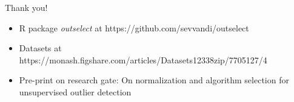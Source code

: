 \documentclass{beamer}
\begin{document}
\begin{darkframes}
 	\begin{frame}{Thank you!}
 	\centering
 	\begin{itemize}
 		\item R package \textit{outselect} at https://github.com/sevvandi/outselect
 		\item Datasets at https://monash.figshare.com/articles/Datasets12338zip/7705127/4
 		\item  Pre-print on research gate: On normalization and algorithm selection for unsupervised outlier detection 
 	\end{itemize}
 
 		
 	\end{frame}
  	\end{darkframes}
\end{document}
